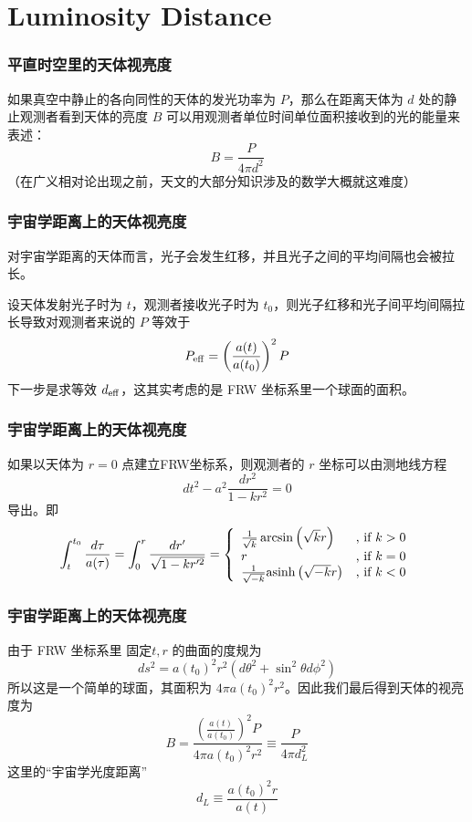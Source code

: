 \documentclass[CJK,13pt]{beamer}
\date{}
\begin{document}
  \bch

  \section{Luminosity Distance}
  
  \begin{frame}
    \frametitle{平直时空里的天体视亮度}
    如果真空中静止的各向同性的天体的发光功率为 $P$，那么在距离天体为 $d$ 处的静止观测者看到天体的亮度 $B$ 可以用观测者单位时间单位面积接收到的光的能量来表述：
    $$ B = \frac{P}{4\pi d^2}$$
    （在广义相对论出现之前，天文的大部分知识涉及的数学大概就这难度）
  \end{frame}

\begin{frame}
  \frametitle{宇宙学距离上的天体视亮度}
  对宇宙学距离的天体而言，光子会发生红移，并且光子之间的平均间隔也会被拉长。

  设天体发射光子时为 $t$，观测者接收光子时为 $t_0$，则光子红移和光子间平均间隔拉长导致对观测者来说的 $P$ 等效于
  $$P_{\rm eff} = \left(\frac{a(t)}{a(t_0)}\right)^2P$$
  下一步是求等效 $d_{\rm eff}$，这其实考虑的是 FRW 坐标系里一个球面的面积。
\end{frame}

\begin{frame}
  \frametitle{宇宙学距离上的天体视亮度}
  如果以天体为 $r=0$ 点建立FRW坐标系，则观测者的 $r$ 坐标可以由测地线方程
  $$ dt^2 - a^2 \frac{dr^2}{1-kr^2}=0$$
  导出。即
  $$ \int_t^{t_0} \frac{d\tau}{a(\tau)} = \int_0^r\frac{dr'}{\sqrt{1-kr'^2}} =
  \left\{\begin{array}{ll}
  \frac{1}{\sqrt{k}}\arcsin{\left(\sqrt{k}r\right)} & \text{, if } k>0 \\
  r & \text{, if } k=0 \\
  \frac{1}{\sqrt{-k}}\mathrm{asinh}\,{\left(\sqrt{-k}r\right)} & \text{, if } k<0
  \end{array}\right.
  $$
\end{frame}



\begin{frame}
  \frametitle{宇宙学距离上的天体视亮度}
  由于 FRW 坐标系里 固定$t, r$ 的曲面的度规为
  $$ ds^2 = a(t_0)^2 r^2 (d\theta^2 + \sin^2\theta d\phi^2) $$
  所以这是一个简单的球面，其面积为 $4\pi a(t_0)^2r^2$。因此我们最后得到天体的视亮度为
  $$ B = \frac{\left(\frac{a(t)}{a(t_0)}\right)^2P}{4\pi a(t_0)^2 r^2} \equiv \frac{P}{4\pi d_L^2}$$
  这里的“宇宙学光度距离”
  $$ d_L \equiv \frac{a(t_0)^2 r}{a(t)}$$
\end{frame}
\end{document}
